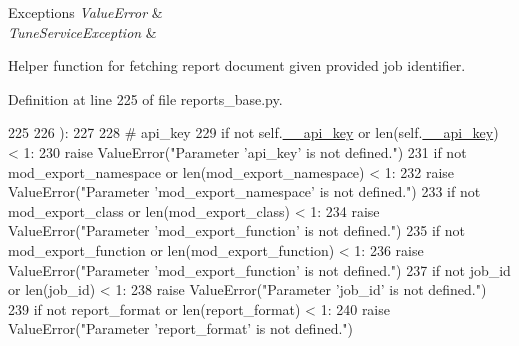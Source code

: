 \begin{DoxyExceptions}{Exceptions}
{\em Value\-Error} & \\
\hline
{\em Tune\-Service\-Exception} & \\
\hline
\end{DoxyExceptions}
\begin{DoxyVerb}     Helper function for fetching report document given provided job identifier.\end{DoxyVerb}
 

Definition at line 225 of file reports\-\_\-base.\-py.


\begin{DoxyCode}
225 
226     ):
227 
228         \textcolor{comment}{# api\_key}
229         \textcolor{keywordflow}{if} \textcolor{keywordflow}{not} self.\hyperlink{classtune_1_1management_1_1reports_1_1reports__base_1_1ReportsBase_a11cc8a3041bc8b00d69f19c743db691c}{\_\_api\_key} \textcolor{keywordflow}{or} len(self.\hyperlink{classtune_1_1management_1_1reports_1_1reports__base_1_1ReportsBase_a11cc8a3041bc8b00d69f19c743db691c}{\_\_api\_key}) < 1:
230             \textcolor{keywordflow}{raise} ValueError(\textcolor{stringliteral}{"Parameter 'api\_key' is not defined."})
231         \textcolor{keywordflow}{if} \textcolor{keywordflow}{not} mod\_export\_namespace \textcolor{keywordflow}{or} len(mod\_export\_namespace) < 1:
232             \textcolor{keywordflow}{raise} ValueError(\textcolor{stringliteral}{"Parameter 'mod\_export\_namespace' is not defined."})
233         \textcolor{keywordflow}{if} \textcolor{keywordflow}{not} mod\_export\_class \textcolor{keywordflow}{or} len(mod\_export\_class) < 1:
234             \textcolor{keywordflow}{raise} ValueError(\textcolor{stringliteral}{"Parameter 'mod\_export\_function' is not defined."})
235         \textcolor{keywordflow}{if} \textcolor{keywordflow}{not} mod\_export\_function \textcolor{keywordflow}{or} len(mod\_export\_function) < 1:
236             \textcolor{keywordflow}{raise} ValueError(\textcolor{stringliteral}{"Parameter 'mod\_export\_function' is not defined."})
237         \textcolor{keywordflow}{if} \textcolor{keywordflow}{not} job\_id \textcolor{keywordflow}{or} len(job\_id) < 1:
238             \textcolor{keywordflow}{raise} ValueError(\textcolor{stringliteral}{"Parameter 'job\_id' is not defined."})
239         \textcolor{keywordflow}{if} \textcolor{keywordflow}{not} report\_format \textcolor{keywordflow}{or} len(report\_format) < 1:
240             \textcolor{keywordflow}{raise} ValueError(\textcolor{stringliteral}{"Parameter 'report\_format' is not defined."})

\end{DoxyCode}
